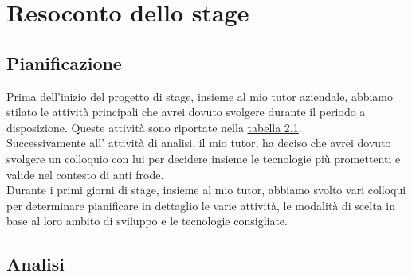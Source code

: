 
\chapter{Resoconto dello stage}
\label{cap:resoconto-stage}

\section{Pianificazione}
Prima dell'inizio del progetto di stage, insieme al mio tutor aziendale, abbiamo stilato le attività principali che avrei dovuto svolgere durante il periodo a disposizione. Queste attività sono riportate nella \hyperref[tab:pian]{tabella 2.1}.\\
Successivamente all' attività di analisi, il mio tutor, ha deciso che avrei dovuto svolgere un colloquio con lui per decidere insieme le tecnologie più promettenti e valide nel contesto di anti frode.\\
Durante i primi giorni di stage, insieme al mio tutor, abbiamo svolto vari colloqui per determinare pianificare in dettaglio le varie attività, le modalità di scelta in base al loro ambito di sviluppo e le tecnologie consigliate.

\section{Analisi}
